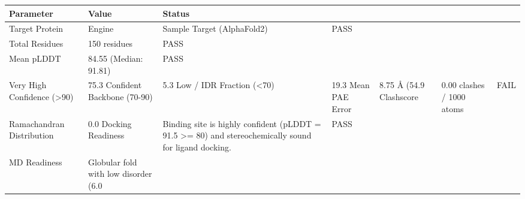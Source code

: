 \begin{tabular}{lll}
\toprule
Parameter & Value & Status \\
\midrule
Target Protein & Engine & Sample Target (AlphaFold2) & PASS \\
Total Residues & 150 residues & PASS \\
Mean pLDDT & 84.55 (Median: 91.81) & PASS \\
Very High Confidence (>90) & 75.3%
Confident Backbone (70-90) & 5.3%
Low / IDR Fraction (<70) & 19.3%
Mean PAE Error & 8.75 Å (54.9%
Clashscore & 0.00 clashes / 1000 atoms & FAIL \\
Ramachandran Distribution & 0.0%
Docking Readiness & Binding site is highly confident (pLDDT = 91.5 >= 80) and stereochemically sound for ligand docking. & PASS \\
MD Readiness & Globular fold with low disorder (6.0%
\bottomrule
\end{tabular}
